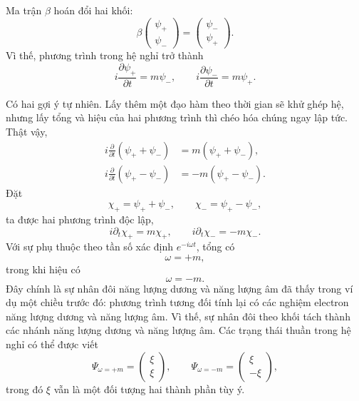 Ma trận \(\beta\) hoán đổi hai khối:
\begin{equation}
\beta
\begin{pmatrix}
\psi_+\\
\psi_-
\end{pmatrix}
=
\begin{pmatrix}
\psi_-\\
\psi_+
\end{pmatrix}.
\end{equation}
Vì thế, phương trình trong hệ nghỉ trở thành
\begin{equation}
i\frac{\partial\psi_+}{\partial t}=m\psi_-,
\qquad
i\frac{\partial\psi_-}{\partial t}=m\psi_+.
\end{equation}

Có hai gợi ý tự nhiên. Lấy thêm một đạo hàm theo thời gian sẽ khử ghép hệ, nhưng lấy tổng và hiệu của hai phương trình thì chéo hóa chúng ngay lập tức. Thật vậy,
\begin{align}
i\frac{\partial}{\partial t}(\psi_++\psi_-)
&=m(\psi_++\psi_-),\\
i\frac{\partial}{\partial t}(\psi_+-\psi_-)
&=-m(\psi_+-\psi_-).
\end{align}
Đặt
\begin{equation}
\chi_+=\psi_++\psi_-,
\qquad
\chi_-=\psi_+-\psi_-,
\end{equation}
ta được hai phương trình độc lập,
\begin{equation}
i\partial_t\chi_+=m\chi_+,
\qquad
i\partial_t\chi_-=-m\chi_-.
\end{equation}
Với sự phụ thuộc theo tần số xác định \(e^{-i\omega t}\), tổng có
\begin{equation}
\omega=+m,
\end{equation}
trong khi hiệu có
\begin{equation}
\omega=-m.
\end{equation}
Đây chính là sự nhân đôi năng lượng dương và năng lượng âm đã thấy trong ví dụ một chiều trước đó: phương trình tương đối tính lại có các nghiệm electron năng lượng dương và năng lượng âm. Vì thế, sự nhân đôi theo khối tách thành các nhánh năng lượng dương và năng lượng âm. Các trạng thái thuần trong hệ nghỉ có thể được viết
\begin{equation}
\Psi_{\omega=+m}=
\begin{pmatrix}
\xi\\
\xi
\end{pmatrix},
\qquad
\Psi_{\omega=-m}=
\begin{pmatrix}
\xi\\
-\xi
\end{pmatrix},
\end{equation}
trong đó \(\xi\) vẫn là một đối tượng hai thành phần tùy ý.

